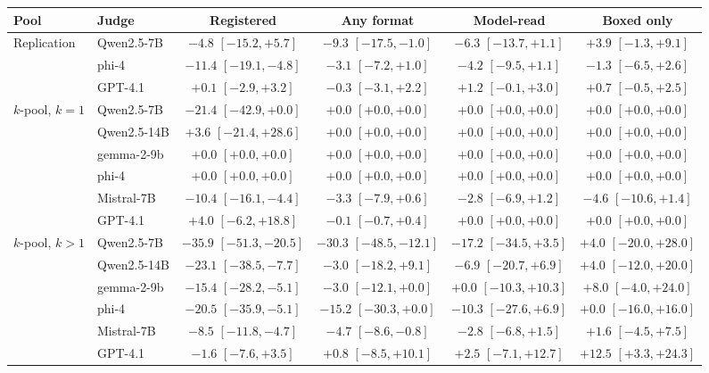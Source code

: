 \begin{tabular}{llcccc}
\toprule
Pool & Judge & Registered & Any format & Model-read & Boxed only \\
\midrule
Replication & Qwen2.5-7B & $-4.8$ {\scriptsize$[-15.2,+5.7]$} & $-9.3$ {\scriptsize$[-17.5,-1.0]$} & $-6.3$ {\scriptsize$[-13.7,+1.1]$} & $+3.9$ {\scriptsize$[-1.3,+9.1]$} \\
 & phi-4 & $-11.4$ {\scriptsize$[-19.1,-4.8]$} & $-3.1$ {\scriptsize$[-7.2,+1.0]$} & $-4.2$ {\scriptsize$[-9.5,+1.1]$} & $-1.3$ {\scriptsize$[-6.5,+2.6]$} \\
 & GPT-4.1 & $+0.1$ {\scriptsize$[-2.9,+3.2]$} & $-0.3$ {\scriptsize$[-3.1,+2.2]$} & $+1.2$ {\scriptsize$[-0.1,+3.0]$} & $+0.7$ {\scriptsize$[-0.5,+2.5]$} \\
\addlinespace
$k$-pool, $k{=}1$ & Qwen2.5-7B & $-21.4$ {\scriptsize$[-42.9,+0.0]$} & $+0.0$ {\scriptsize$[+0.0,+0.0]$} & $+0.0$ {\scriptsize$[+0.0,+0.0]$} & $+0.0$ {\scriptsize$[+0.0,+0.0]$} \\
 & Qwen2.5-14B & $+3.6$ {\scriptsize$[-21.4,+28.6]$} & $+0.0$ {\scriptsize$[+0.0,+0.0]$} & $+0.0$ {\scriptsize$[+0.0,+0.0]$} & $+0.0$ {\scriptsize$[+0.0,+0.0]$} \\
 & gemma-2-9b & $+0.0$ {\scriptsize$[+0.0,+0.0]$} & $+0.0$ {\scriptsize$[+0.0,+0.0]$} & $+0.0$ {\scriptsize$[+0.0,+0.0]$} & $+0.0$ {\scriptsize$[+0.0,+0.0]$} \\
 & phi-4 & $+0.0$ {\scriptsize$[+0.0,+0.0]$} & $+0.0$ {\scriptsize$[+0.0,+0.0]$} & $+0.0$ {\scriptsize$[+0.0,+0.0]$} & $+0.0$ {\scriptsize$[+0.0,+0.0]$} \\
 & Mistral-7B & $-10.4$ {\scriptsize$[-16.1,-4.4]$} & $-3.3$ {\scriptsize$[-7.9,+0.6]$} & $-2.8$ {\scriptsize$[-6.9,+1.2]$} & $-4.6$ {\scriptsize$[-10.6,+1.4]$} \\
 & GPT-4.1 & $+4.0$ {\scriptsize$[-6.2,+18.8]$} & $-0.1$ {\scriptsize$[-0.7,+0.4]$} & $+0.0$ {\scriptsize$[+0.0,+0.0]$} & $+0.0$ {\scriptsize$[+0.0,+0.0]$} \\
\addlinespace
$k$-pool, $k{>}1$ & Qwen2.5-7B & $-35.9$ {\scriptsize$[-51.3,-20.5]$} & $-30.3$ {\scriptsize$[-48.5,-12.1]$} & $-17.2$ {\scriptsize$[-34.5,+3.5]$} & $+4.0$ {\scriptsize$[-20.0,+28.0]$} \\
 & Qwen2.5-14B & $-23.1$ {\scriptsize$[-38.5,-7.7]$} & $-3.0$ {\scriptsize$[-18.2,+9.1]$} & $-6.9$ {\scriptsize$[-20.7,+6.9]$} & $+4.0$ {\scriptsize$[-12.0,+20.0]$} \\
 & gemma-2-9b & $-15.4$ {\scriptsize$[-28.2,-5.1]$} & $-3.0$ {\scriptsize$[-12.1,+0.0]$} & $+0.0$ {\scriptsize$[-10.3,+10.3]$} & $+8.0$ {\scriptsize$[-4.0,+24.0]$} \\
 & phi-4 & $-20.5$ {\scriptsize$[-35.9,-5.1]$} & $-15.2$ {\scriptsize$[-30.3,+0.0]$} & $-10.3$ {\scriptsize$[-27.6,+6.9]$} & $+0.0$ {\scriptsize$[-16.0,+16.0]$} \\
 & Mistral-7B & $-8.5$ {\scriptsize$[-11.8,-4.7]$} & $-4.7$ {\scriptsize$[-8.6,-0.8]$} & $-2.8$ {\scriptsize$[-6.8,+1.5]$} & $+1.6$ {\scriptsize$[-4.5,+7.5]$} \\
 & GPT-4.1 & $-1.6$ {\scriptsize$[-7.6,+3.5]$} & $+0.8$ {\scriptsize$[-8.5,+10.1]$} & $+2.5$ {\scriptsize$[-7.1,+12.7]$} & $+12.5$ {\scriptsize$[+3.3,+24.3]$} \\
\bottomrule
\end{tabular}
